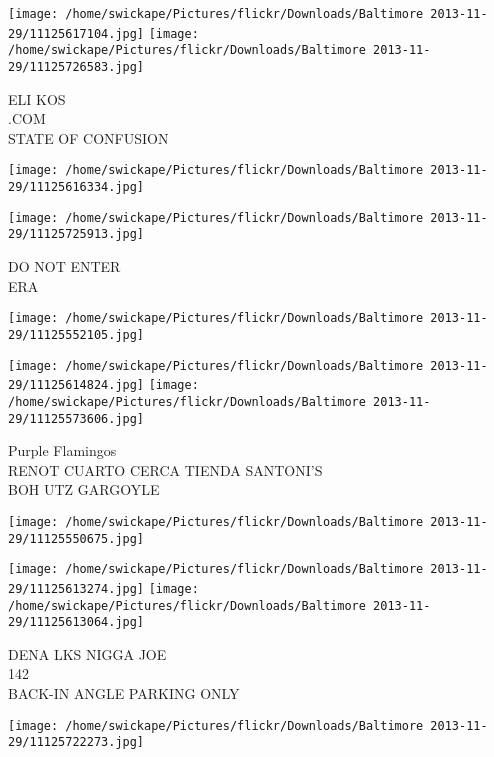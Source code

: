\documentclass[10pt,letterpaper]{article}
\begin{document}
\vspace{0.25in}
\texttt{[image: /home/swickape/Pictures/flickr/Downloads/Baltimore 2013-11-29/11125617104.jpg]}
\texttt{[image: /home/swickape/Pictures/flickr/Downloads/Baltimore 2013-11-29/11125726583.jpg]}

ELI KOS\\
.COM\\
STATE OF CONFUSION\\
\pagebreak

\texttt{[image: /home/swickape/Pictures/flickr/Downloads/Baltimore 2013-11-29/11125616334.jpg]}

\vspace{0.25in}
\texttt{[image: /home/swickape/Pictures/flickr/Downloads/Baltimore 2013-11-29/11125725913.jpg]}

DO NOT ENTER\\
ERA\\
\pagebreak

\texttt{[image: /home/swickape/Pictures/flickr/Downloads/Baltimore 2013-11-29/11125552105.jpg]}

\vspace{0.25in}
\texttt{[image: /home/swickape/Pictures/flickr/Downloads/Baltimore 2013-11-29/11125614824.jpg]}
\texttt{[image: /home/swickape/Pictures/flickr/Downloads/Baltimore 2013-11-29/11125573606.jpg]}

Purple Flamingos\\
RENOT CUARTO CERCA TIENDA SANTONI'S\\
BOH UTZ GARGOYLE\\
\pagebreak

\texttt{[image: /home/swickape/Pictures/flickr/Downloads/Baltimore 2013-11-29/11125550675.jpg]}

\vspace{0.25in}
\texttt{[image: /home/swickape/Pictures/flickr/Downloads/Baltimore 2013-11-29/11125613274.jpg]}
\texttt{[image: /home/swickape/Pictures/flickr/Downloads/Baltimore 2013-11-29/11125613064.jpg]}

DENA LKS NIGGA JOE\\
142\\
BACK{-}IN ANGLE PARKING ONLY\\
\pagebreak

\texttt{[image: /home/swickape/Pictures/flickr/Downloads/Baltimore 2013-11-29/11125722273.jpg]}
\end{document}
